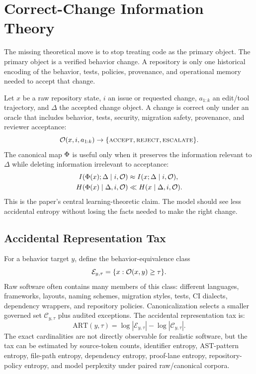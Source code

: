 \section{Correct-Change Information Theory}
\label{sec:correct-change-info}

The missing theoretical move is to stop treating code as the primary object. The primary object is a verified behavior change. A repository is only one historical encoding of the behavior, tests, policies, provenance, and operational memory needed to accept that change.

Let $x$ be a raw repository state, $i$ an issue or requested change, $a_{1:k}$ an edit/tool trajectory, and $\Delta$ the accepted change object. A change is correct only under an oracle that includes behavior, tests, security, migration safety, provenance, and reviewer acceptance:
\begin{equation}
  \mathcal{O}(x,i,a_{1:k}) \rightarrow \{\textsc{accept},\textsc{reject},\textsc{escalate}\}.
\end{equation}
The canonical map $\Phi$ is useful only when it preserves the information relevant to $\Delta$ while deleting information irrelevant to acceptance:
\begin{align}
  I(\Phi(x);\Delta \mid i,\mathcal{O})
    &\approx I(x;\Delta \mid i,\mathcal{O}), \\
  H(\Phi(x)\mid \Delta,i,\mathcal{O})
    &\ll H(x\mid \Delta,i,\mathcal{O}).
\end{align}
This is the paper's central learning-theoretic claim. The model should see less accidental entropy without losing the facts needed to make the right change.

\subsection{Accidental Representation Tax}

For a behavior target $y$, define the behavior-equivalence class
\begin{equation}
  \mathcal{E}_{y,\tau}=\{x : \mathcal{O}(x,y)\ge \tau\}.
\end{equation}
Raw software often contains many members of this class: different languages, frameworks, layouts, naming schemes, migration styles, tests, CI dialects, dependency wrappers, and repository policies. Canonicalization selects a smaller governed set $\mathcal{C}_{y,\tau}$ plus audited exceptions. The accidental representation tax is:
\begin{equation}
  \mathrm{ART}(y,\tau)=\log |\mathcal{E}_{y,\tau}|-\log |\mathcal{C}_{y,\tau}|.
\end{equation}
The exact cardinalities are not directly observable for realistic software, but the tax can be estimated by source-token counts, identifier entropy, AST-pattern entropy, file-path entropy, dependency entropy, proof-lane entropy, repository-policy entropy, and model perplexity under paired raw/canonical corpora.


